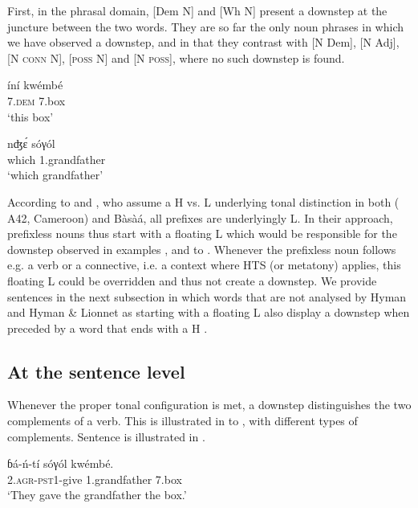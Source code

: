 \documentclass[output=paper,newtxmath,modfonts,nonflat,hidelinks]{langsci/langscibook}
\begin{document}
First, in the phrasal domain, [Dem N] and [Wh N] present a downstep at the juncture between the two words. They are so far the only noun phrases in which we have observed a downstep, and in that they contrast with [N Dem], [N Adj], [N \textsc{conn} N], [\textsc{poss} N] and [N \textsc{poss}], where no such downstep is found. 

\ea \gll íní {\↓}kwémbé\\
7.\textsc{dem} 7.box\\
\glt `this box'\label{ex:HamlaouiMakasso:5}\\
\z

\ea \gll nʤ\'ɛ {\↓}sóγól\\
which 1.grandfather\\
\glt `which grandfather' \label{ex:HamlaouiMakasso:6}\\
\z

\noindent According to \citet{Hyman03} and \citet{HymanLionnet14}, who assume a H vs. L underlying tonal distinction in both  ( A42, Cameroon) and Bàsà{á}, all  prefixes are underlyingly L. In their approach, prefixless nouns thus start with a floating L  which would be responsible for the downstep observed in examples ,  and  to . Whenever the prefixless noun follows e.g. a verb or a connective, i.e. a context where HTS (or metatony) applies, this floating L  could be overridden and thus not create a downstep. We provide sentences in the next subsection in which words that are not analysed by Hyman and Hyman \& Lionnet as starting with a floating L  also display a downstep when preceded by a word that ends with a H .


\subsection{At the sentence level}

Whenever the proper tonal configuration is met, a downstep distinguishes the two complements of a verb. This is illustrated in  to , with different types of complements. Sentence  is illustrated in .

\ea \gll  ɓ{á}-ń-tí sóγól {\↓}kwémbé.\\
2.\textsc{agr}-\textsc{pst1}-give 1.grandfather 7.box\\
\glt `They gave the grandfather the box.'\label{ex:HamlaouiMakasso:7}
\z
\end{document}
